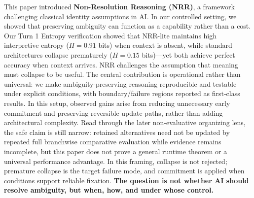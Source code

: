\documentclass[11pt,a4paper]{article}
\begin{document}
This paper introduced \textbf{Non-Resolution Reasoning (NRR)}, a framework challenging classical identity assumptions in AI.
In our controlled setting, we showed that preserving ambiguity can function as a capability rather than a cost.
Our Turn 1 Entropy verification showed that NRR-lite maintains high interpretive entropy ($H = 0.91$ bits) when context is absent, while standard architectures collapse prematurely ($H = 0.15$ bits)---yet both achieve perfect accuracy when context arrives.
NRR challenges the assumption that meaning must collapse to be useful.
The central contribution is operational rather than universal: we make ambiguity-preserving reasoning reproducible and testable under explicit conditions, with boundary/failure regions reported as first-class results.
In this setup, observed gains arise from reducing unnecessary early commitment and preserving reversible update paths, rather than adding architectural complexity. Read through the later non-evaluative organizing lens, the safe claim is still narrow: retained alternatives need not be updated by repeated full branchwise comparative evaluation while evidence remains incomplete, but this paper does not prove a general runtime theorem or a universal performance advantage.
In this framing, collapse is not rejected; premature collapse is the target failure mode, and commitment is applied when conditions support reliable fixation.
\textbf{The question is not whether AI should resolve ambiguity, but when, how, and under whose control.}
\end{document}
